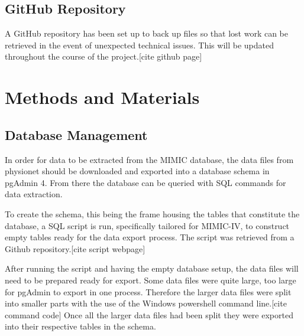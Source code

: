 \documentclass[11pt]{article}
\begin{document}

\subsection{GitHub Repository}
A GitHub repository has been set up to back up files so that lost work can be retrieved in the event of unexpected technical issues. This will be updated throughout the course of the project.[cite github page]

\section{Methods and Materials}

\subsection{Database Management}
In order for data to be extracted from the MIMIC database, the data files from physionet should be downloaded and exported into a database schema in pgAdmin 4. From there the database can be queried with SQL commands for data extraction.

To create the schema, this being the frame housing the tables that constitute the database, a SQL script is run, specifically tailored for MIMIC-IV, to construct empty tables ready for the data export process. The script was retrieved from a Github repository.[cite script webpage]

After running the script and having the empty database setup, the data files will need to be prepared ready for export. Some data files were quite large, too large for pgAdmin to export in one process. Therefore the larger data files were split into smaller parts with the use of the Windows powershell command line.[cite command code] Once all the larger data files had been split they were exported into their respective tables in the schema.
\end{document}
